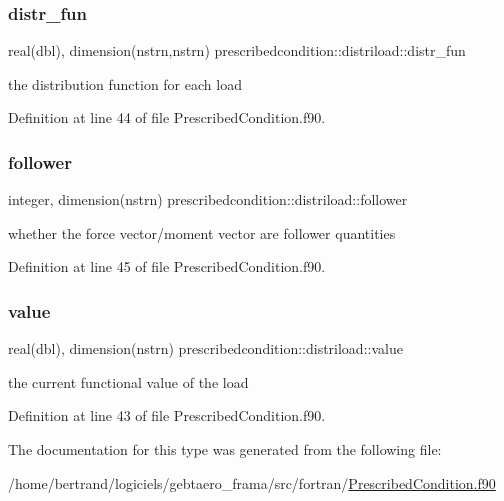\subsubsection{\texorpdfstring{distr\+\_\+fun}{distr\_fun}}
{\footnotesize\ttfamily real(dbl), dimension(nstrn,nstrn) prescribedcondition\+::distriload\+::distr\+\_\+fun\hspace{0.3cm}{\ttfamily [private]}}



the distribution function for each load 



Definition at line 44 of file Prescribed\+Condition.\+f90.

\mbox{\label{structprescribedcondition_1_1distriload_a476acfacfaac7a9d8ebaf6ce371279ff}} 
\subsubsection{\texorpdfstring{follower}{follower}}
{\footnotesize\ttfamily integer, dimension(nstrn) prescribedcondition\+::distriload\+::follower\hspace{0.3cm}{\ttfamily [private]}}



whether the force vector/moment vector are follower quantities 



Definition at line 45 of file Prescribed\+Condition.\+f90.

\mbox{\label{structprescribedcondition_1_1distriload_a32fb9fe519f0164a70313c8e7627976b}} 
\subsubsection{\texorpdfstring{value}{value}}
{\footnotesize\ttfamily real(dbl), dimension(nstrn) prescribedcondition\+::distriload\+::value\hspace{0.3cm}{\ttfamily [private]}}



the current functional value of the load 



Definition at line 43 of file Prescribed\+Condition.\+f90.



The documentation for this type was generated from the following file\+:\begin{DoxyCompactItemize}
\item 
/home/bertrand/logiciels/gebtaero\+\_\+frama/src/fortran/\hyperlink{_prescribed_condition_8f90}{Prescribed\+Condition.\+f90}\end{DoxyCompactItemize}
